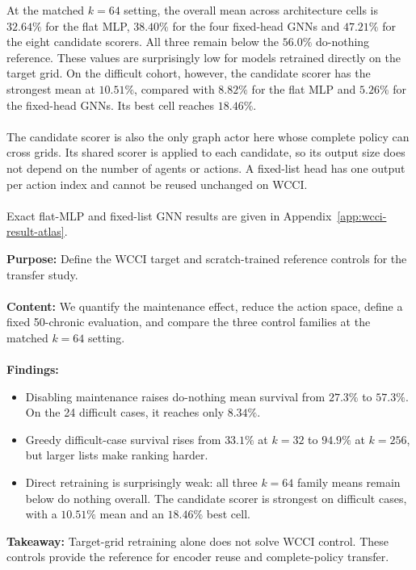 \noindent At the matched \(k=64\) setting, the overall mean across architecture
cells is \(32.64\%\) for the flat MLP, \(38.40\%\) for the four fixed-head GNNs and \(47.21\%\) for
the eight candidate scorers. All three remain below the \(56.0\%\) do-nothing
reference. These values are surprisingly low for models
retrained directly on the target grid. On the difficult cohort, however, the candidate scorer has the
strongest mean at \(10.51\%\), compared with \(8.82\%\) for the flat MLP and
\(5.26\%\) for the fixed-head GNNs. Its best cell reaches \(18.46\%\).
\\
\\
The candidate scorer is also the only graph actor here whose complete policy
can cross grids. Its shared scorer is applied to each candidate, so its output
size does not depend on the number of agents or actions. A fixed-list head has
one output per action index and cannot be reused unchanged on WCCI.
\\
\\
Exact flat-MLP and fixed-list GNN results are given in
Appendix~\ref{app:wcci-result-atlas}.

\begin{tcolorbox}[
  colframe=red!75!black,
  colback=red!5!white,
  title=Chapter 7 Summary: Target Environment and Controls]
\textbf{Purpose:} Define the WCCI target and scratch-trained
reference controls for the transfer study.
\\
\\
\textbf{Content:} We quantify the maintenance effect, reduce
the action space, define a fixed 50-chronic evaluation, and compare the three
control families at the matched $k=64$ setting.
\\
\\
\textbf{Findings:}
\begin{itemize}
  \item Disabling maintenance raises do-nothing mean survival from $27.3\%$ to
  $57.3\%$. On the 24 difficult cases, it reaches only $8.34\%$.
  \item Greedy difficult-case survival rises from $33.1\%$ at $k=32$ to
  $94.9\%$ at $k=256$, but larger lists make ranking harder.
  \item Direct retraining is surprisingly weak: all three
  $k=64$ family means remain below do nothing overall. The candidate scorer is
  strongest on difficult cases, with a $10.51\%$ mean and an $18.46\%$ best
  cell.
\end{itemize}
\textbf{Takeaway:} Target-grid retraining alone does not solve
WCCI control. These controls provide the reference for encoder reuse and
complete-policy transfer.
\end{tcolorbox}
